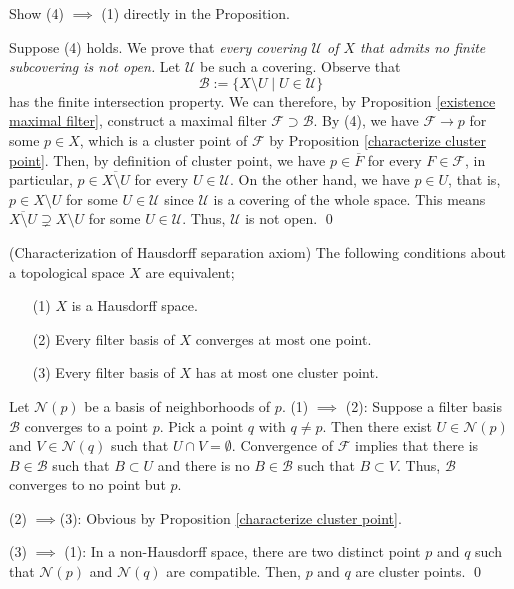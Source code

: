 \documentclass{report}
\begin{document}
\begin{exe}
    Show (4) \( \implies \) (1) directly in the Proposition.
\end{exe}
\begin{prf}
    Suppose (4) holds. We prove that \textit{every covering \( \mathscr{U} \) of \( X \) that admits no finite subcovering is not open.}
    Let \( \mathscr{U} \) be such a covering. Observe that
    \begin{equation*}
        \mathscr{B}:=\{X \setminus U \mid U \in \mathscr{U}\}
    \end{equation*}
    has the finite intersection property. We can therefore, by Proposition \ref{existence maximal filter}, construct a maximal filter \( \mathscr{F} \supset \mathscr{B} \). By (4), we have \( \mathscr{F}\to p \) for some \( p \in X \), which is a cluster point of \( \mathscr{F} \) by Proposition \ref{characterize cluster point}. Then, by definition of cluster point, we have \( p \in \overline{F} \) for every \( F \in \mathscr{F} \), in particular, \( p \in \overline{X \setminus U} \) for every \( U \in \mathscr{U} \).
    On the other hand, we have \( p \in U \), that is, \( p \in X \setminus U \) for some \( U \in \mathscr{U} \) since \( \mathscr{U} \) is a covering of the whole space. This means \( \overline{X \setminus U} \supsetneq X \setminus U \) for some \( U \in \mathscr{U} \). Thus, \( \mathscr{U} \) is not open.
    \qed\end{prf}

\begin{prp}\label{characterize Hausdorff} (Characterization of Hausdorff separation axiom)
    The following conditions about a topological space \( X \) are equivalent;
    \begin{itemize}
        \item[(1)] \( X \) is a Hausdorff space.
        \item[(2)] Every filter basis of \( X \) converges at most one point.
        \item[(3)] Every filter basis of \( X \) has at most one cluster point.
    \end{itemize}
\end{prp}
\begin{prf}
    Let \( \mathscr{N}(p) \) be a basis of neighborhoods of \( p \).
    (1) \( \implies  \) (2):
    Suppose a filter basis \( \mathscr{B} \) converges to a point \( p \). Pick a point \( q \) with \( q \neq p \). Then there exist \( U \in \mathscr{N}(p) \) and \( V \in \mathscr{N}(q)\) such that \( U \cap V = \emptyset \). Convergence of \( \mathscr{F} \) implies that there is \( B \in \mathscr{B} \) such that \( B \subset U \) and there is no \( B \in \mathscr{B}\) such that \( B \subset V \). Thus, \( \mathscr{B} \) converges to no point but \( p \).

    (2) \( \implies \)(3): Obvious by Proposition \ref{characterize cluster point}.

    (3) \( \implies \) (1):
    In a non-Hausdorff space, there are two distinct point \( p \) and \( q \) such that \( \mathscr{N}(p) \) and \( \mathscr{N}(q) \) are compatible. Then, \( p \) and \( q \) are cluster points.
    \qed\end{prf}
\end{document}
